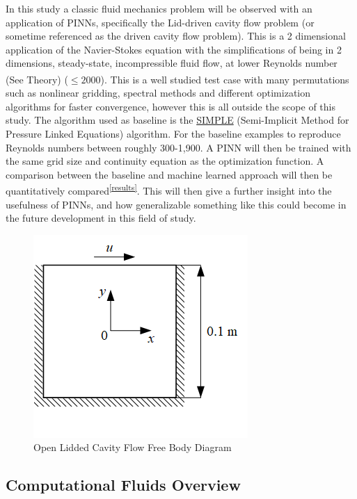 \documentclass{article}
\begin{document}
	In this study a classic fluid mechanics problem will be observed with an application of PINNs, specifically the Lid-driven cavity flow problem (or sometime referenced as the driven cavity flow problem). This is a 2 dimensional application of the Navier-Stokes equation with the simplifications of being in 2 dimensions, steady-state, incompressible fluid flow, at lower Reynolds number (See Theory\textsuperscript{\pageref{theory}}) ($\le 2000$). This is a well studied test case with many permutations such as nonlinear gridding, spectral methods and different optimization algorithms for faster convergence, however this is all outside the scope of this study. The algorithm used as baseline is the \href{https://en.wikipedia.org/wiki/SIMPLE_algorithm}{SIMPLE} (Semi-Implicit Method for Pressure Linked Equations) algorithm. For the baseline examples to reproduce Reynolds numbers between roughly 300-1,900. A PINN will then be trained with the same grid size and continuity equation as the optimization function. A comparison between the baseline and machine learned approach will then be quantitatively compared\textsuperscript{\ref{results}}. This will then give a further insight into the usefulness of PINNs, and how generalizable something like this could become in the future development in this field of study.
	
	 \begin{figure}[ht!]
		\centering
		\includegraphics[scale=1]{./images/ldc.png}
		\caption{Open Lidded Cavity Flow Free Body Diagram \cite{NVIDIA}}
		\label{fig:OLC}
	\end{figure}
	
	
	\subsection{Computational Fluids Overview}
	
\end{document}
